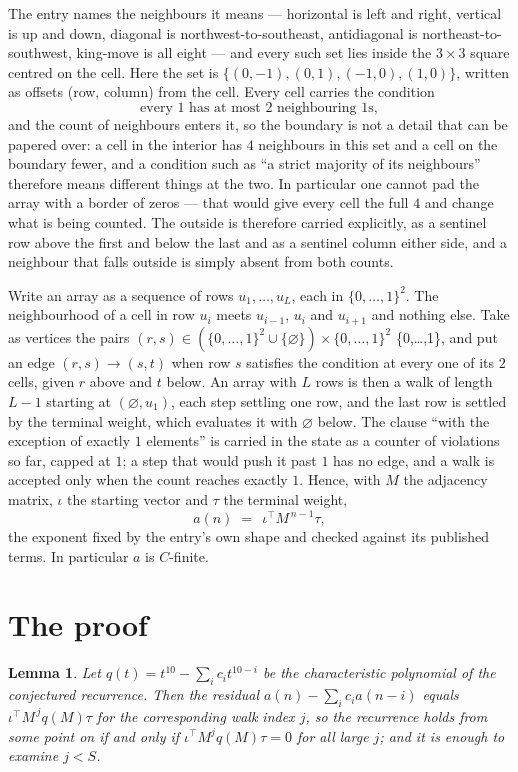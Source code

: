 \documentclass[11pt,a4paper]{article}
\theoremstyle{plain}
\newtheorem{lemma}[theorem]{Lemma}
\theoremstyle{definition}
\begin{document}
The entry names the neighbours it means --- horizontal is left and right, vertical is up and
down, diagonal is northwest-to-southeast, antidiagonal is northeast-to-southwest, king-move is
all eight --- and every such set lies inside the $3\times3$ square centred on the cell. Here
the set is $\{(0,-1), (0,1), (-1,0), (1,0)\}$, written as offsets (row, column) from the cell. Every cell carries
the condition
\[
\text{every 1 has at most 2 neighbouring 1s},
\]
and the count of neighbours enters it, so the boundary is not a detail that can be papered
over: a cell in the interior has $4$ neighbours in this set and a cell on the boundary
fewer, and a condition such as ``a strict majority of its neighbours'' therefore means
different things at the two. In particular one cannot pad the array with a border of zeros ---
that would give every cell the full $4$ and change what is being counted. The outside is
therefore carried
explicitly, as a sentinel row above the first and below the last and as a sentinel column
either side, and a neighbour that falls outside is simply absent from both counts.

Write an array as a sequence of rows $u_1,\dots,u_L$, each in
$\{0,\dots,1\}^{2}$. The neighbourhood of a cell in row $u_i$ meets $u_{i-1}$,
$u_i$ and $u_{i+1}$ and nothing else. Take as vertices the pairs
$(r,s)\in(\{0,\dots,1\}^{2}\cup\{\varnothing\})\times\{0,\dots,1\}^{2}$ \times \{0,\dots,1\},
and put an edge $(r,s)\to(s,t)$ when row $s$ satisfies the condition at every one of its
$2$ cells, given $r$ above and $t$ below. An array with $L$ rows is then a walk of length
$L-1$ starting at $(\varnothing,u_1)$, each step settling one row, and the last row is
settled by the terminal weight, which evaluates it with $\varnothing$ below. The clause ``with the exception of exactly $1$ elements'' is carried in
the state as a counter of violations so far, capped at $1$; a step that would push it past
$1$ has no edge, and a walk is accepted only when the count reaches exactly $1$. Hence,
with $M$ the adjacency matrix, $\iota$ the starting vector and $\tau$ the terminal weight,
\[
a(n)\;=\;\,\iota^{\!\top}M^{\,n-1}\tau ,
\]
the exponent fixed by the entry's own shape and checked against its published terms. In
particular $a$ is $C$-finite.

\section{The proof}

\begin{lemma}\label{lem:crit}
Let $q(t)=t^{10}-\sum_i c_it^{10-i}$ be the characteristic polynomial of the
conjectured recurrence. Then the residual $a(n)-\sum_ic_ia(n-i)$ equals
$\iota^{\!\top}M^{\,j}q(M)\tau$ for the corresponding walk index $j$, so the
recurrence holds from some point on if and only if $\iota^{\!\top}M^{j}q(M)\tau=0$ for all
large $j$; and it is enough to examine $j<S$.
\end{lemma}
\end{document}
